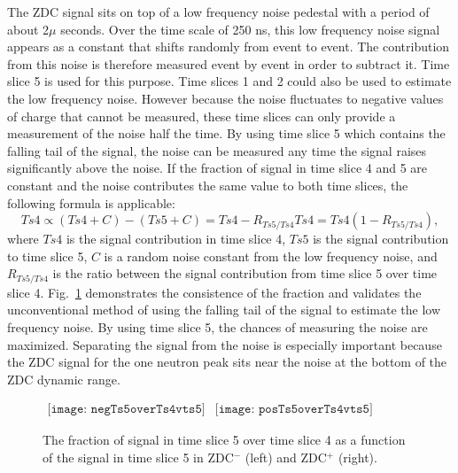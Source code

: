       The ZDC signal sits on top of a low frequency noise pedestal with a 
        period of about 2$\mu$ seconds. 
      Over the time scale of 250 ns, this low frequency noise signal appears
        as a constant that shifts randomly from event to event.
      The contribution from this noise is therefore measured event by event
        in order to subtract it.
      Time slice 5 is used for this purpose.
      Time slices 1 and 2 could also be used to estimate the low frequency 
        noise.
      However because the noise fluctuates to negative values of charge that 
        cannot be measured, these time slices can only provide a 
        measurement of the noise half the time. 
      By using time slice 5 which contains the falling tail of the signal, 
        the noise can be measured any time the signal raises significantly 
        above the noise.
      If the fraction of signal in time slice 4 and 5 are constant and
        the noise contributes the same value to both time slices, the 
        following formula is applicable:
      \begin{equation}
        Ts4 \propto (Ts4 + C) - ( Ts5 + C ) = Ts4 - R_{Ts5/Ts4}Ts4 
        = Ts4(1-R_{Ts5/Ts4}),
        \label{eq:ts4ish}
      \end{equation}
      where $Ts4$ is the signal contribution in time slice 4, $Ts5$ is the 
        signal contribution to time slice 5, $C$ is a random noise constant
        from the low frequency noise, and $R_{Ts5/Ts4}$ is the ratio between
        the signal contribution from time slice 5 over time slice 4.
      Fig.~\ref{fig:zdcTs4OvTs5VTs5} demonstrates the consistence of the 
        fraction and validates the unconventional method of using the falling 
        tail of the signal to estimate the low frequency noise. 
      By using time slice 5, the chances of measuring the noise are maximized. 
      Separating the signal from the noise is especially important because
        the ZDC signal for the one neutron peak sits near the noise at the 
        bottom of the ZDC dynamic range.
      \begin{figure}[!Hhbt]
        \centering
        $ \begin{array}{cc}
          \texttt{[image: negTs5overTs4vts5]} &
          \texttt{[image: posTs5overTs4vts5]}
        \end{array} $  
        \caption{ The fraction of signal in time slice 5 over time slice 4 
          as a function of the signal in time slice 5 in ZDC$^{-}$ (left) and 
          ZDC$^{+}$ (right).}
        \label{fig:zdcTs4OvTs5VTs5}
      \end{figure}
      
